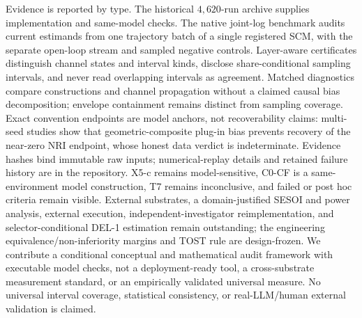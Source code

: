 Evidence is reported by type. The historical $4{,}620$-run archive supplies
implementation and same-model checks. The native joint-log benchmark audits
current estimands from one trajectory batch of a single registered SCM, with
the separate open-loop stream and sampled negative controls. Layer-aware
certificates distinguish channel states and interval kinds, disclose
share-conditional sampling intervals, and never read overlapping intervals as
agreement. Matched diagnostics compare constructions and channel propagation
without a claimed causal bias decomposition; envelope containment remains
distinct from sampling coverage. Exact convention endpoints are model anchors,
not recoverability claims: multi-seed studies show that geometric-composite
plug-in bias prevents recovery of the near-zero NRI endpoint, whose honest data
verdict is indeterminate. Evidence hashes bind immutable raw inputs;
numerical-replay details and retained failure history are in the repository.
X5-c remains model-sensitive,
C0-CF is a same-environment model construction, T7 remains inconclusive, and
failed or post hoc criteria remain visible. External substrates, a
domain-justified SESOI and power analysis, external execution,
independent-investigator reimplementation, and selector-conditional DEL-1
estimation remain outstanding; the engineering equivalence/non-inferiority
margins and TOST rule are design-frozen. We contribute a conditional conceptual
and mathematical audit framework with executable model checks, not a
deployment-ready tool, a cross-substrate measurement standard, or an
empirically validated universal measure. No universal interval coverage,
statistical consistency, or real-LLM/human external validation is claimed.
